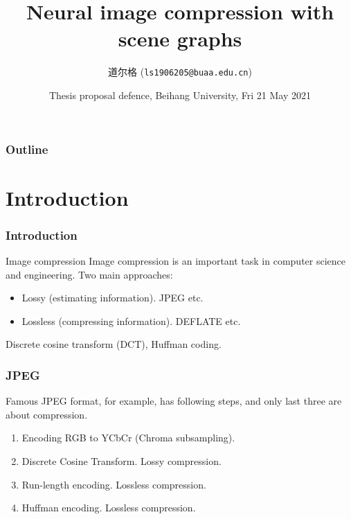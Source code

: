 \documentclass[10pt]{beamer}
\title{Neural image compression with scene graphs}
\author{道尔格 (\texttt{ls1906205@buaa.edu.cn})}
\date{Thesis proposal defence, Beihang University, Fri  21 May 2021}
\begin{document}
\begin{frame}[plain]
    \maketitle
\end{frame}

\begin{frame}
    \frametitle{Outline}
    \tableofcontents
\end{frame}

\section{Introduction}

\begin{frame}
    \frametitle{Introduction}
    \begin{block}{Image compression}
        Image compression is an important task in computer science and engineering.
        Two main approaches:
        \begin{itemize}
            \item Lossy (estimating information). JPEG etc.
            \item Lossless (compressing information). DEFLATE etc.
        \end{itemize}
        Discrete cosine transform (DCT), Huffman coding.
    \end{block}
\end{frame}

\begin{frame}
    \frametitle{JPEG}
    Famous JPEG format, for example, has following steps, and only last three are about compression.

    \begin{enumerate}
        \item Encoding RGB to YCbCr (Chroma subsampling).
        \item Discrete Cosine Transform. Lossy compression.
        \item Run-length encoding. Lossless compression.
        \item Huffman encoding. Lossless compression.
    \end{enumerate}
\end{frame}
\end{document}
